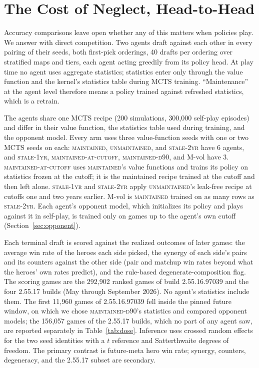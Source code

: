 \documentclass[journal]{IEEEtran}
\newcommand{\maintained}{\textsc{maintained}}          %
\newcommand{\maintainedpred}{\textsc{maintained-d90}}  %
\newcommand{\mcut}{\textsc{maintained-at-cutoff}}      %
\newcommand{\stalefour}{\textsc{unmaintained}}          %
\newcommand{\staleone}{\textsc{stale-1yr}}
\newcommand{\staletwo}{\textsc{stale-2yr}}
\begin{document}
\section{The Cost of Neglect, Head-to-Head}
\label{sec:neglect}

Accuracy comparisons leave open whether any of this matters when
policies play. We answer with direct competition. Two agents draft
against each other in every pairing of their seeds, both first-pick
orderings, 40 drafts per ordering over stratified maps and tiers, each
agent acting greedily from its policy head. At play time no agent uses
aggregate statistics; statistics enter only through the value function
and the kernel's statistics table during MCTS training. ``Maintenance''
at the agent level therefore means a policy trained against refreshed
statistics, which is a retrain.

The agents share one MCTS recipe (200 simulations, 300{,}000
self-play episodes) and differ in their value function, the statistics
table used during training, and the opponent model. Every arm uses
three value-function seeds with one or two MCTS seeds on each:
\maintained{}, \stalefour{}, and \staletwo{} have 6 agents, and
\staleone{}, \mcut{}, \maintainedpred{}, and M-vol have 3. \mcut{}
uses \maintained{}'s value functions and trains its policy on statistics
frozen at the cutoff; it is the maintained recipe trained at the cutoff
and then left alone. \staleone{} and \staletwo{} apply \stalefour{}'s
leak-free recipe at cutoffs one and two years earlier. M-vol is
\maintained{} trained on as many rows as \staletwo{}. Each agent's
opponent model, which initializes its policy and plays against it in
self-play, is trained only on games up to the agent's own cutoff
(Section~\ref{sec:opponent}).

Each terminal draft is scored against the realized outcomes of later
games: the average win rate of the heroes each side picked, the synergy
of each side's pairs and its counters against the other side (pair and
matchup win rates beyond what the heroes' own rates predict), and the
rule-based degenerate-composition flag. The scoring games are the
292{,}902 ranked games of build 2.55.16.97039 and the four 2.55.17
builds (May through September 2026). No agent's statistics include
them. The first 11{,}960 games of 2.55.16.97039 fell inside the pinned
future window, on which we chose \maintainedpred{}'s statistics and
compared opponent models; the 156{,}057 games of the 2.55.17 builds,
which no part of any agent saw, are reported separately in
Table~\ref{tab:dose}. Inference uses crossed random effects for the two
seed identities with a $t$ reference and Satterthwaite degrees of
freedom. The primary contrast is future-meta hero win rate; synergy,
counters, degeneracy, and the 2.55.17 subset are secondary.
\end{document}
